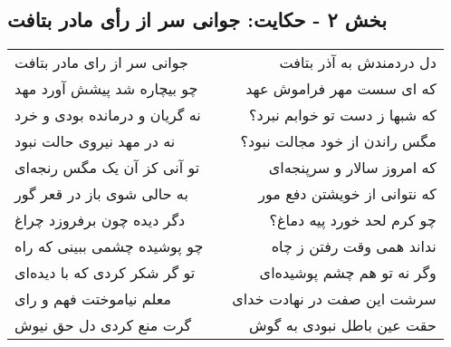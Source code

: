 \begin{center}
\section*{بخش ۲ - حکایت: جوانی سر از رأی مادر بتافت}
\label{sec:002}
\begin{longtable}{l p{0.5cm} r}
جوانی سر از رای مادر بتافت
&&
دل دردمندش به آذر بتافت
\\
چو بیچاره شد پیشش آورد مهد
&&
که ای سست مهر فراموش عهد
\\
نه گریان و درمانده بودی و خرد
&&
که شبها ز دست تو خوابم نبرد؟
\\
نه در مهد نیروی حالت نبود
&&
مگس راندن از خود مجالت نبود؟
\\
تو آنی کز آن یک مگس رنجه‌ای
&&
که امروز سالار و سرپنجه‌ای
\\
به حالی شوی باز در قعر گور
&&
که نتوانی از خویشتن دفع مور
\\
دگر دیده چون برفروزد چراغ
&&
چو کرم لحد خورد پیه دماغ؟
\\
چو پوشیده چشمی ببینی که راه
&&
نداند همی وقت رفتن ز چاه
\\
تو گر شکر کردی که با دیده‌ای
&&
وگر نه تو هم چشم پوشیده‌ای
\\
معلم نیاموختت فهم و رای
&&
سرشت این صفت در نهادت خدای
\\
گرت منع کردی دل حق نیوش
&&
حقت عین باطل نبودی به گوش
\\
\end{longtable}
\end{center}
